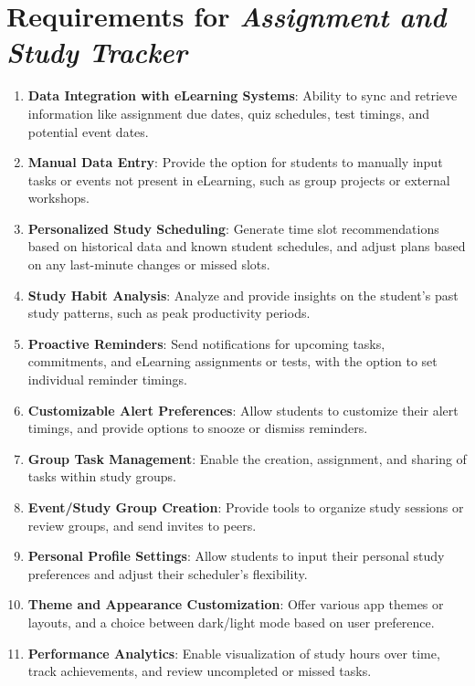 \documentclass[12pt]{article}
\newcommand\projectname{\textit{Assignment and Study Tracker\ }}
\begin{document}
\section{Requirements for \projectname}
    \begin{enumerate}
        \item \textbf{Data Integration with eLearning Systems}: Ability to sync and retrieve information like assignment due dates, quiz schedules, test timings, and potential event dates.
        \item \textbf{Manual Data Entry}: Provide the option for students to manually input tasks or events not present in eLearning, such as group projects or external workshops.
        \item \textbf{Personalized Study Scheduling}: Generate time slot recommendations based on historical data and known student schedules, and adjust plans based on any last-minute changes or missed slots.
        \item \textbf{Study Habit Analysis}: Analyze and provide insights on the student's past study patterns, such as peak productivity periods.
        \item \textbf{Proactive Reminders}: Send notifications for upcoming tasks, commitments, and eLearning assignments or tests, with the option to set individual reminder timings.
        \item \textbf{Customizable Alert Preferences}: Allow students to customize their alert timings, and provide options to snooze or dismiss reminders.
        \item \textbf{Group Task Management}: Enable the creation, assignment, and sharing of tasks within study groups.
        \item \textbf{Event/Study Group Creation}: Provide tools to organize study sessions or review groups, and send invites to peers.
        \item \textbf{Personal Profile Settings}: Allow students to input their personal study preferences and adjust their scheduler's flexibility.
        \item \textbf{Theme and Appearance Customization}: Offer various app themes or layouts, and a choice between dark/light mode based on user preference.
        \item \textbf{Performance Analytics}: Enable visualization of study hours over time, track achievements, and review uncompleted or missed tasks.
    \end{enumerate}
\end{document}
